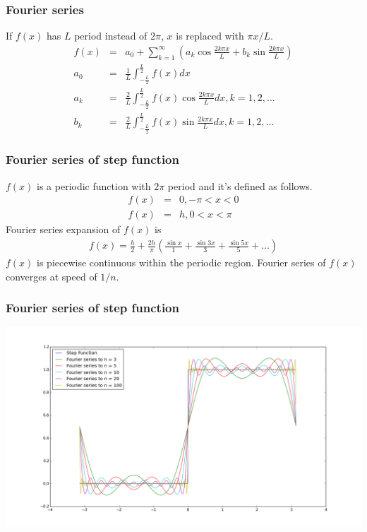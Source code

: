 \documentclass{beamer}
\begin{document}
\begin{frame}
\frametitle{Fourier series}
If $f(x)$ has $L$ period instead of $2\pi$, $x$ is replaced with $\pi x /L$.
\begin{eqnarray}
f(x)&=&a_0 + \sum_{k=1}^{\infty} \left(a_k\cos \frac{2k\pi x}{L} + b_k \sin \frac{2k\pi x}{L}\right) \nonumber \\
a_0&=&\frac{1}{L}\int_{-\frac{L}{2}}^{\frac{L}{2}}f(x) dx \nonumber \\
a_k&=&\frac{2}{L}\int_{-\frac{L}{2}}^{\frac{L}{2}}f(x) \cos \frac{2k\pi x}{L} dx, k = 1,2,...\nonumber \\
b_k&=&\frac{2}{L}\int_{-\frac{L}{2}}^{\frac{L}{2}}f(x) \sin \frac{2k\pi x}{L} dx, k = 1,2,...
\label{eq:fseries_pL}
\end{eqnarray}
\end{frame}
\begin{frame}
\frametitle{Fourier series of step function}
$f(x)$ is a periodic function with $2\pi$ period and it's defined as follows.
\begin{eqnarray}
f(x)&=& 0, -\pi < x < 0 \nonumber \\
f(x)&=& h, 0 < x < \pi
\label{eq:stepfunc}
\end{eqnarray}
Fourier series expansion of $f(x)$ is
\begin{eqnarray}
f(x)= \frac{h}{2} + \frac{2h}{\pi} \left( \frac{\sin x}{1} + \frac{\sin 3x}{3} + \frac{\sin 5x}{5} + ...\right)
\label{eq:stepfunc_ft}
\end{eqnarray}
$f(x)$ is piecewise continuous within the periodic region. Fourier series of $f(x)$ converges at speed of $1/n$.
\end{frame}
\begin{frame}
\frametitle{Fourier series of step function}
\includegraphics[scale=0.3]{step.png}
\end{frame}
\end{document}
